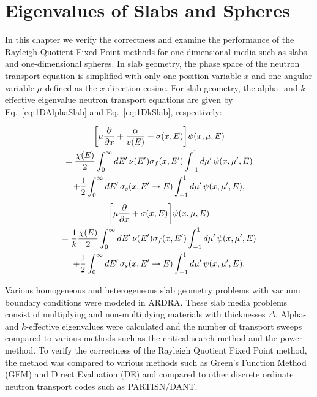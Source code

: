 \chapter{Eigenvalues of Slabs and Spheres}

In this chapter we verify the correctness and examine the performance of the Rayleigh Quotient Fixed Point methods for one-dimensional media such as slabs and one-dimensional spheres. In slab geometry, the phase space of the neutron transport equation is simplified with only one position variable $x$ and one angular variable $\mu$ defined as the $x$-direction cosine. For slab geometry, the alpha- and $k$-effective eigenvalue neutron transport equations are given by Eq.~\ref{eq:1DAlphaSlab} and Eq.~\ref{eq:1DkSlab}, respectively:

\begin{multline}
\bigg [ \mu \frac{\partial}{\partial x} + \frac{\alpha}{v(E)} + \sigma(x,E) \bigg ] \psi(x,\mu,E) \\ = \frac{\chi(E)}{2} \int_{0}^{\infty} \mathop{}\!d E' \, \nu(E') \sigma_{f}(x,E') \int_{-1}^{1} \mathop{}\!d \mu' \, \psi(x,\mu',E) \\ + \frac{1}{2} \int_{0}^{\infty} \mathop{}\!d E' \, \sigma_{s}(x, E' \rightarrow E) \int_{-1}^{1} \mathop{}\!d \mu' \, \psi(x,\mu',E),
\label{eq:1DAlphaSlab}
\end{multline}
\begin{multline}
\bigg [ \mu \frac{\partial}{\partial x}  + \sigma(x,E) \bigg ] \psi(x,\mu,E) \\ = \frac{1}{k} \frac{\chi(E)}{2} \int_{0}^{\infty} \mathop{}\!d E' \, \nu(E') \sigma_{f}(x,E') \int_{-1}^{1} \mathop{}\!d \mu' \,\psi(x,\mu',E) \\ + \frac{1}{2} \int_{0}^{\infty} \mathop{}\!d E' \, \sigma_{s}(x, E' \rightarrow E) \int_{-1}^{1} \mathop{}\!d \mu' \, \psi(x,\mu',E).
\label{eq:1DkSlab}
\end{multline}

Various homogeneous and heterogeneous slab geometry problems with vacuum boundary conditions were modeled in ARDRA. These slab media problems consist of multiplying and non-multiplying materials with thicknesses $\Delta$. Alpha- and $k$-effective eigenvalues were calculated and the number of transport sweeps compared to various methods such as the critical search method and the power method. To verify the correctness of the Rayleigh Quotient Fixed Point method, the method was compared to various methods such as Green's Function Method (GFM) and Direct Evaluation (DE) and compared to other discrete ordinate neutron transport codes such as PARTISN/DANT.


